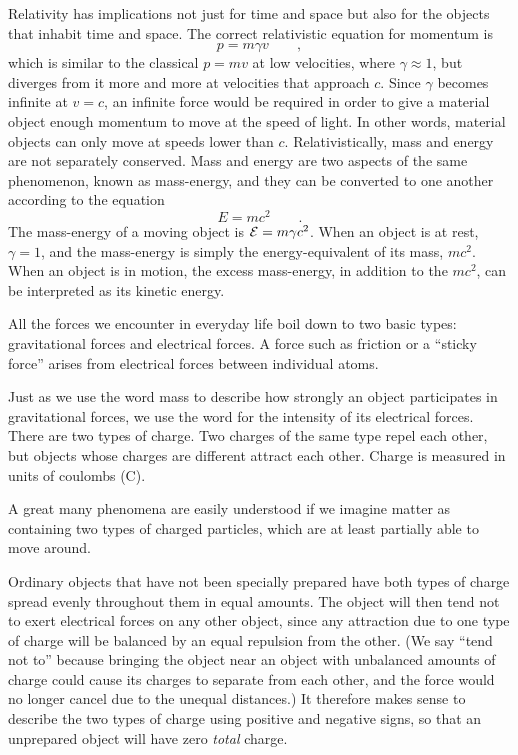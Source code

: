 Relativity has implications not just for time and space but also for the objects that
inhabit time and space. The correct relativistic equation for momentum is
\begin{equation*}
  p = m \gamma v \qquad ,
\end{equation*}
which is similar to the classical $p=mv$ at low velocities, where $\gamma\approx1$, but
diverges from it more and more at velocities that approach $c$.
Since $\gamma$ becomes infinite at $v=c$, an infinite force would be required in order
to give a material object enough momentum to move at the speed of light. In other words,
material objects can only move at speeds lower than $c$. Relativistically,
mass and energy are not separately conserved. Mass and energy are two aspects
of the same phenomenon, known as mass-energy, and they can be converted to one another
according to the equation
\begin{equation*}
  E=mc^2 \qquad .
\end{equation*}
The mass-energy of a moving object is $\mathcal{E}=m\gamma c^2$. When an object is at rest,
$\gamma=1$, and the mass-energy is simply the energy-equivalent of its mass, $mc^2$.
When an object is in motion, the excess mass-energy, in addition to the $mc^2$, can be interpreted as its
kinetic energy.


	All the forces we encounter in everyday life boil down to
	two basic types: gravitational forces and electrical forces.
	A force such as friction or a ``sticky force'' arises from
	electrical forces between individual atoms.
	
	Just as we use the word mass to describe how strongly an
	object participates in gravitational forces, we use the word
	 for the intensity of its electrical forces. There
	are two types of charge. Two charges of the same type repel
	each other, but objects whose charges are different attract
	each other. Charge is measured in units of coulombs (C).
	
	 A great many phenomena are
	easily understood if we imagine matter as containing two
	types of charged particles, which are at least partially
	able to move around.
	
	  Ordinary objects that have not
	been specially prepared have both types of charge spread
	evenly throughout them in equal amounts. The object will
	then tend not to exert electrical forces on any other
	object, since any attraction due to one type of charge will
	be balanced by an equal repulsion from the other. (We say
	``tend not to'' because bringing the object near an object
	with unbalanced amounts of charge could cause its charges to
	separate from each other, and the force would no longer
	cancel due to the unequal distances.) It therefore makes
	sense to describe the two types of charge using positive and
	negative signs, so that an unprepared object will have zero
	\emph{total} charge.
	

